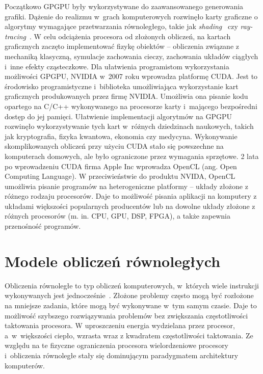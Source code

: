 Początkowo GPGPU były wykorzystywane do zaawansowanego generowania grafiki. Dążenie do realizmu w~grach komputerowych rozwinęło karty graficzne o algorytmy wymagające przetwarzania równoległego, takie jak \emph{shading}~\cite{b18} czy \emph{ray-tracing}~\cite{b3}. W celu odciążenia procesora od złożonych obliczeń, na kartach graficznych zaczęto implementować fizykę obiektów – obliczenia związane z mechaniką klasyczną, symulacje zachowania cieczy, zachowania układów ciągłych i~inne efekty cząsteczkowe. Dla ułatwienia programistom wykorzystania możliwości GPGPU, NVIDIA w~2007 roku wprowadza platformę CUDA. Jest to środowisko programistyczne i~biblioteka umożliwiająca wykorzystanie kart graficznych produkowanych przez firmę NVIDIA. Umożliwia ona pisanie kodu opartego na C/C++ wykonywanego na procesorze karty i~mającego bezpośredni dostęp do jej pamięci. Ułatwienie implementacji algorytmów na GPGPU rozwinęło wykorzystywanie tych kart w~różnych dziedzinach naukowych, takich jak kryptografia, fizyka kwantowa, ekonomia czy medycyna. Wykonywanie  skomplikowanych obliczeń przy użyciu CUDA stało się powszechne na komputerach domowych, ale było ograniczone przez wymagania sprzętowe. 2 lata po wprowadzeniu CUDA firma Apple Inc wprowadza OpenCL (ang. Open Computing Language). W przeciwieństwie do produktu NVIDA, OpenCL umożliwia pisanie programów na heterogeniczne platformy – układy złożone z różnego rodzaju procesorów. Daje to możliwość pisania aplikacji na komputery z układami większości popularnych producentów lub  na dowolne układy złożone z różnych procesorów (m. in. CPU, GPU, DSP, FPGA), a także zapewnia przenośność programów.



\section{Modele obliczeń równoległych}\label{sec:Paralellism}

Obliczenia równoległe to typ obliczeń komputerowych, w~których wiele instrukcji wykonywanych jest jednocześnie~\cite{b14}. Złożone problemy często mogą być rozłożone na mniejsze zadania, które mogą być wykonywane w~tym samym czasie. Daje to możliwość szybszego rozwiązywania problemów bez zwiększania częstotliwości taktowania procesora. W uproszczeniu energia wydzielana przez procesor, a~w~większości ciepło, wzrasta wraz z kwadratem częstotliwości taktowania. Ze względu na te fizyczne ograniczenia procesora wielordzeniowe procesory i~obliczenia równoległe stały się dominującym paradygmatem architektury komputerów.

